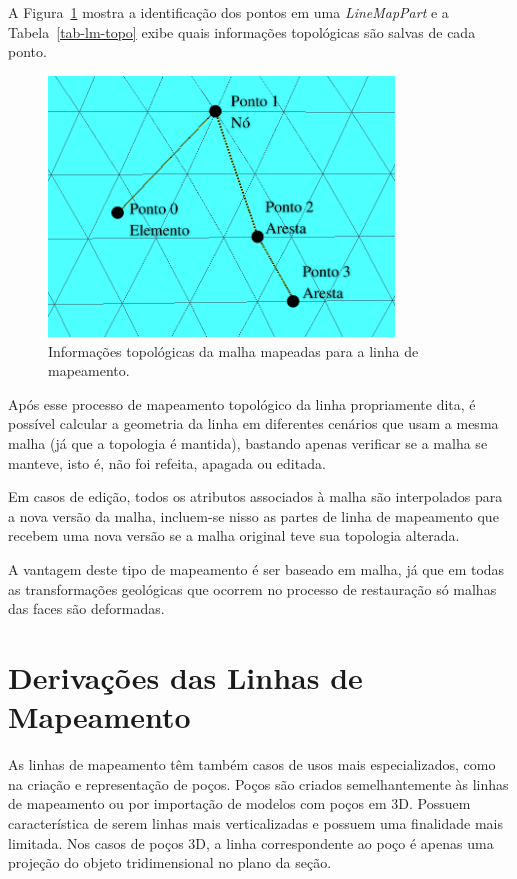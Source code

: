 A Figura~\ref{fig-lm-topo} mostra a identificação dos pontos em uma \textit{LineMapPart} e a Tabela~\ref{tab-lm-topo} exibe quais informações topológicas são salvas de cada ponto.

\begin{figure} [hbt!]
  \begin{center}
    \includegraphics[width=260pt]{images/fig-lm-topo}
    \caption{Informações topológicas da malha mapeadas para a linha de mapeamento.}\label{fig-lm-topo}
  \end{center}
\end{figure}



Após esse processo de mapeamento topológico da linha propriamente dita, é possível calcular a geometria da linha em diferentes cenários que usam a mesma malha (já que a topologia é mantida), bastando apenas verificar se a malha se manteve, isto é, não foi refeita, apagada ou editada.

Em casos de edição, todos os atributos associados à malha são interpolados para a nova versão da malha, incluem-se nisso as partes de linha de mapeamento que recebem uma nova versão se a malha original teve sua topologia alterada.

A vantagem deste tipo de mapeamento é ser baseado em malha, já que em todas as transformações geológicas que ocorrem no processo de restauração só malhas das faces são deformadas.

\section{Derivações das Linhas de Mapeamento}

As linhas de mapeamento têm também casos de usos mais especializados, como na criação e representação de poços. Poços são criados semelhantemente às linhas de mapeamento ou por importação de modelos com poços em 3D. Possuem característica de serem linhas mais verticalizadas e possuem uma finalidade mais limitada. Nos casos de poços 3D, a linha correspondente ao poço é apenas uma projeção do objeto tridimensional no plano da seção.

